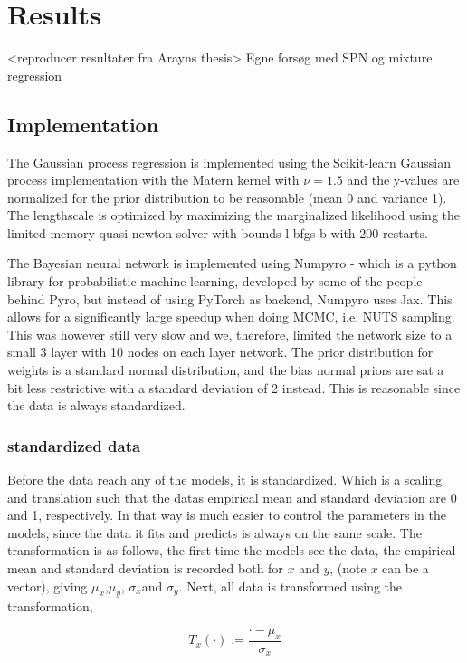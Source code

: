 \chapter{Results}

<reproducer resultater fra Arayns thesis>
Egne forsøg med SPN og mixture regression


\section{Implementation}
The Gaussian process regression is implemented using the Scikit-learn Gaussian process
implementation with the Matern kernel with $\nu=1.5$ and the y-values are normalized for
the prior distribution to be reasonable (mean 0 and variance 1). The lengthscale is optimized by
maximizing the marginalized likelihood using the limited memory quasi-newton solver with bounds
l-bfgs-b with 200 restarts. 

The Bayesian neural network is implemented using Numpyro - which is a python library for
probabilistic machine learning, developed by some of the people behind Pyro, but instead of using
PyTorch as backend, Numpyro uses Jax. This allows for a significantly large speedup when doing MCMC,
i.e. NUTS sampling. This was however still very slow and we, therefore, limited the network size to a
small 3 layer with 10 nodes on each layer network. The prior distribution for weights is a standard
normal distribution, and the bias normal priors are sat 
a bit less restrictive with a standard deviation of 2 instead. 
This is reasonable since the data is always standardized. 

\subsection{standardized data}
Before the data reach any of the models, it is standardized. Which is 
a scaling and translation such that the datas empirical mean and standard deviation are 0 and 1, respectively. 
In that way is much easier to control the parameters in the models, since the data it fits and predicts
is always on the same scale. The transformation is as follows, the first time the models see the data, 
the empirical mean and standard deviation is recorded both for $x$ and $y$, (note $x$ can be a vector),
giving $\mu_x$,$\mu_y$, $\sigma_x$and $\sigma_y$.
Next, all data is transformed using the transformation, 

$$T_x(\cdot) := \frac{\cdot-\mu_x}{\sigma_x}$$

